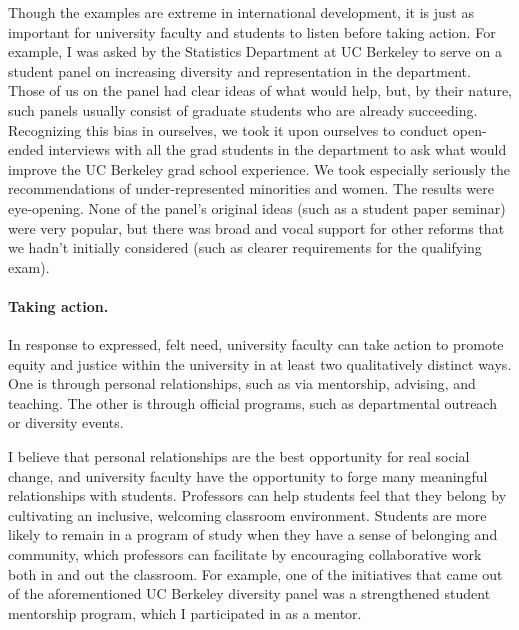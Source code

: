 Though the examples are extreme in international development, it is just as
important for university faculty and students to listen before taking action.
For example, I was asked by the Statistics Department at UC Berkeley to serve on
a student panel on increasing diversity and representation in the department.
Those of us on the panel had clear ideas of what would help, but, by their
nature, such panels usually consist of graduate students who are already
succeeding. Recognizing this bias in ourselves, we took it upon ourselves to
conduct open-ended interviews with all the grad students in the department to ask
what would improve the UC Berkeley grad school experience.  We took especially
seriously the recommendations of under-represented minorities and women. The
results were eye-opening.  None of the panel's original ideas (such as a student
paper seminar) were very popular, but there was broad and vocal support for
other reforms that we hadn't initially considered (such as clearer requirements
for the qualifying exam).

\paragraph{Taking action.}
%
In response to expressed, felt need, university faculty can take action to
promote equity and justice within the university in at least two qualitatively
distinct ways.  One is through personal relationships, such as via mentorship,
advising, and teaching.  The other is through official programs, such as
departmental outreach or diversity events.

I believe that personal relationships are the best opportunity for real social
change, and university faculty have the opportunity to forge many meaningful
relationships with students.  Professors can help students feel that they belong
by cultivating an inclusive, welcoming classroom environment. Students are more
likely to remain in a program of study when they have a sense of belonging and
community, which professors can facilitate by encouraging collaborative work
both in and out the classroom. For example, one of the initiatives that came out
of the aforementioned UC Berkeley diversity panel was a strengthened student
mentorship program, which I participated in as a mentor.

